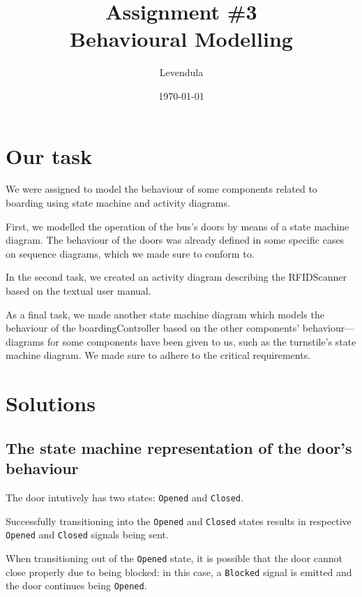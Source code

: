 \documentclass[a4paper]{article}
\title{Assignment \#3 \\ Behavioural Modelling}
\author{Levendula}
\date{\today}
\begin{document}


\tableofcontents
\listoffigures
\clearpage



\section{Our task}

We were assigned to model the behaviour of some components related to boarding
using state machine and activity diagrams.

First, we modelled the operation of the bus's doors by means of a state machine
diagram. The behaviour of the doors was already defined in some specific cases
on sequence diagrams, which we made sure to conform to.

In the second task, we created an activity diagram describing the
\gls{RFIDScanner} based on the textual user manual.

As a final task, we made another state machine diagram which models the
behaviour of the \gls{boardingController} based on the other components'
behaviour—diagrams for some components have been given to us, such as the
\gls{turnstile}'s state machine diagram. We made sure to adhere to the critical
requirements.


\section{Solutions}


\subsection{The state machine representation of the door's behaviour}

The door intutively has two states: \texttt{Opened} and \texttt{Closed}.

Successfully transitioning into the \texttt{Opened} and \texttt{Closed} states
results in respective \texttt{Opened} and \texttt{Closed} signals being sent.

When transitioning out of the \texttt{Opened} state, it is possible that the
door cannot close properly due to being blocked: in this case, a
\texttt{Blocked} signal is emitted and the door continues being \texttt{Opened}.
\end{document}
